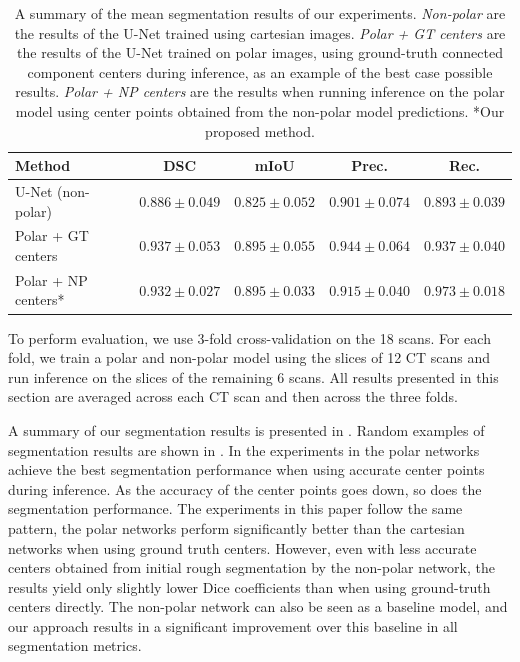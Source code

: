 \begin{table}[h]
\def\arraystretch{1.25}
\centering
\begin{tabular}{l c c c c} 
 \hline
 Method & DSC & mIoU & Prec. & Rec. \\ 
 \hline
U-Net (non-polar) & $0.886 \pm 0.049$ & $0.825 \pm 0.052$ & $0.901 \pm 0.074$ & $0.893 \pm 0.039$ \\
Polar + GT centers & $0.937 \pm 0.053$ & $0.895 \pm 0.055$ & $0.944 \pm 0.064$ & $0.937 \pm 0.040$ \\
Polar + NP centers* & $0.932 \pm 0.027$ & $0.895 \pm 0.033$ & $0.915 \pm 0.040$ & $0.973 \pm 0.018$ \\
\hline
\end{tabular}
\caption{A summary of the mean segmentation results of our experiments. \textit{Non-polar} are the results of the U-Net trained using cartesian images. \textit{Polar + GT centers} are the results of the U-Net trained on polar images, using ground-truth connected component centers during inference, as an example of the best case possible results. \textit{Polar + NP centers} are the results when running inference on the polar model using center points obtained from the non-polar model predictions. *Our proposed method.}
\label{table:results}
\end{table}

To perform evaluation, we use 3-fold cross-validation on the 18 scans. For each fold, we train a polar and non-polar model using the slices of 12 CT scans and run inference on the slices of the remaining 6 scans. All results presented in this section are averaged across each CT scan and then across the three folds.

A summary of our segmentation results is presented in . Random examples of segmentation results are shown in . In the experiments in \cite{bencevicTrainingPolarImage2021} the polar networks achieve the best segmentation performance when using accurate center points during inference. As the accuracy of the center points goes down, so does the segmentation performance. The experiments in this paper follow the same pattern, the polar networks perform significantly better than the cartesian networks when using ground truth centers. However, even with less accurate centers obtained from initial rough segmentation by the non-polar network, the results yield only slightly lower Dice coefficients than when using ground-truth centers directly. The non-polar network can also be seen as a baseline model, and our approach results in a significant improvement over this baseline in all segmentation metrics.

